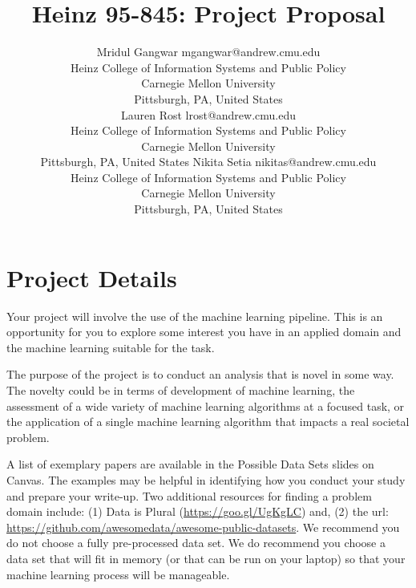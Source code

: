 \documentclass[twoside,11pt]{article}
\begin{document}
\title{Heinz 95-845: Project Proposal}

\author{\name Mridul Gangwar \email mgangwar@andrew.cmu.edu \\
       \addr Heinz College of Information Systems and Public Policy\\
       Carnegie Mellon University\\
       Pittsburgh, PA, United States \\
       \AND
       \name Lauren Rost \email lrost@andrew.cmu.edu \\
       \addr Heinz College of Information Systems and Public Policy\\
       Carnegie Mellon University\\
       Pittsburgh, PA, United States
       \AND
       \name Nikita Setia \email nikitas@andrew.cmu.edu \\
       \addr Heinz College of Information Systems and Public Policy\\
       Carnegie Mellon University\\
       Pittsburgh, PA, United States}
\maketitle


\section{Project Details}
Your project will involve the use of the machine learning pipeline. This is an opportunity for you to explore some interest you have in an applied domain and the machine learning suitable for the task.

The purpose of the project is to conduct an analysis that is novel in some way. The novelty could be in terms of development of machine learning, the assessment of a wide variety of machine learning algorithms at a focused task, or the application of a single machine learning algorithm that impacts a real societal problem.

A list of exemplary papers are available in the Possible Data Sets slides on Canvas. The examples may be helpful in identifying how you conduct your study and prepare your write-up. Two additional resources for finding a problem domain include: (1) Data is Plural (\url{https://goo.gl/UgKgLC}) and, (2) the url: \url{https://github.com/awesomedata/awesome-public-datasets}. We recommend you do not choose a fully pre-processed data set. We do recommend you choose a data set that will fit in memory (or that can be run on your laptop) so that your machine learning process will be manageable.
\end{document}
